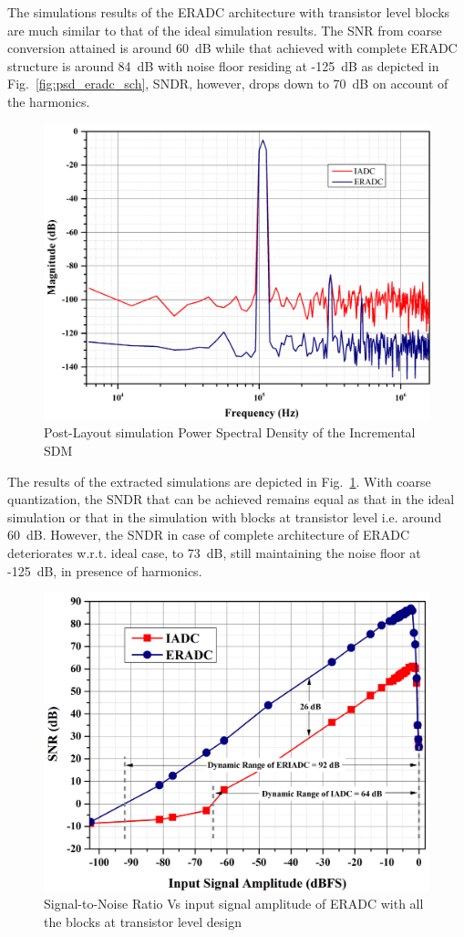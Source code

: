 The simulations results of the ERADC architecture with transistor level blocks are much similar to that of the ideal simulation results. The SNR from coarse conversion attained is around 60~dB while that achieved with complete ERADC structure is around 84~dB with noise floor residing at -125~dB as depicted in Fig.~\ref{fig:psd_eradc_sch}, SNDR, however, drops down to 70~dB on account of the harmonics.
%
\begin{figure}[h!]
    \centering
    \includegraphics[width=0.8\columnwidth]{Chap06/Figures/PSD_ISDM_av.jpg}
    \caption{Post-Layout simulation Power Spectral Density of the Incremental SDM}
    \label{fig:psd_iadc_sav}
\end{figure}
%
The results of the extracted simulations are depicted in Fig.~\ref{fig:psd_iadc_sav}. With coarse quantization, the SNDR that can be achieved remains equal as that in the ideal simulation or that in the simulation with blocks at transistor level i.e. around 60~dB. However, the SNDR in case of complete architecture of ERADC deteriorates w.r.t. ideal case, to 73~dB, still maintaining the noise floor at -125~dB, in presence of harmonics.
%
\begin{figure}[h!]
    \centering
    \includegraphics[width=0.8\columnwidth]{Chap06/Figures/PSD_ERADC.jpg}
    \caption{Signal-to-Noise Ratio Vs input signal amplitude of ERADC with all the blocks at transistor level design}
    \label{fig:snr_vs_input_sch}
\end{figure}
%

